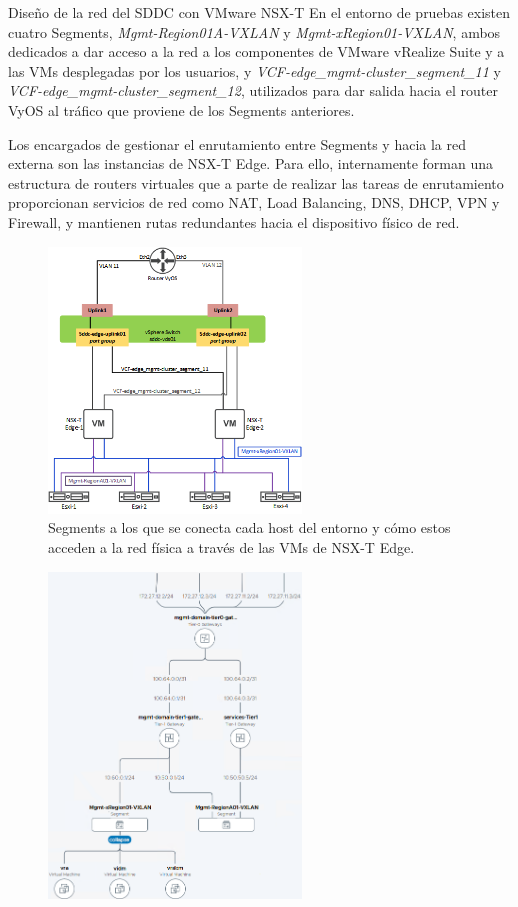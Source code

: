\begin{subsubsection}{Diseño de la red del SDDC con VMware NSX-T}
    En el entorno de pruebas existen cuatro Segments, \textit{Mgmt-Region01A-VXLAN} y \textit{Mgmt-xRegion01-VXLAN}, ambos dedicados a dar acceso a la red a los componentes de VMware vRealize Suite y a las VMs desplegadas por los usuarios, y \textit{VCF-edge\_mgmt-cluster\_segment\_11} y \textit{VCF-edge\_mgmt-cluster\_segment\_12}, utilizados para dar salida hacia el router VyOS al tráfico que proviene de los Segments anteriores.

    Los encargados de gestionar el enrutamiento entre Segments y hacia la red externa son las instancias de NSX-T Edge. Para ello, internamente forman una estructura de routers virtuales que a parte de realizar las tareas de enrutamiento proporcionan servicios de red como NAT, Load Balancing, DNS, DHCP, VPN y Firewall, y mantienen rutas redundantes hacia el dispositivo físico de red.
    \begin{figure}[h]
        \centering
        \includegraphics[width=0.6\textwidth]{imaxes/pruebaconcepto/estructura_NSX_T.png}
        \caption{Segments a los que se conecta cada host del entorno y cómo estos acceden a la red física a través de las VMs de NSX-T Edge.}
        \label{fig:estructura-NSXT}
      \end{figure}
    \FloatBarrier
    \begin{figure}[h]
        \centering
        \includegraphics[width=0.6\textwidth]{imaxes/pruebaconcepto/topology-con-servicios.png}

\end{figure}
\end{subsubsection}
